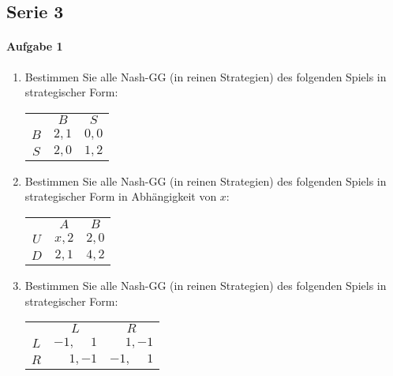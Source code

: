 \subsection{Serie 3}%
\label{sub:serie_3}

\paragraph{Aufgabe 1}%
\label{par:aufgabe_1}

\begin{enumerate}
  \item Bestimmen Sie alle Nash-GG (in reinen Strategien) des folgenden Spiels in
    strategischer Form:
    \begin{center}
      \begin{tabular}{ccc}
        & $B$ & $S$\\
        \cmidrule{2-3}
        $B$ & $2,1$ & $0,0$\\
        \cmidrule{2-3}
        $S$ & $2,0$ & $1,2$\\
        \cmidrule{2-3}
      \end{tabular}
    \end{center}
  \item Bestimmen Sie alle Nash-GG (in reinen Strategien) des folgenden Spiels in
    strategischer Form in Abhängigkeit von $x$:
    \begin{center}
      \begin{tabular}{ccc}
        & $A$ & $B$\\
        \cmidrule{2-3}
        $U$ & $x,2$ & $2,0$\\
        \cmidrule{2-3}
        $D$ & $2,1$ & $4,2$\\
        \cmidrule{2-3}
      \end{tabular}
    \end{center}
  \item Bestimmen Sie alle Nash-GG (in reinen Strategien) des folgenden Spiels in
    strategischer Form:
    \begin{center}
      \begin{tabular}{ccc}
        & $L$ & $R$\\
        \cmidrule{2-3}
        $L$ & $-1, \phantom{-}1$ & $\phantom{-}1, -1$\\
        \cmidrule{2-3}
        $R$ & $\phantom{-}1, -1$ & $-1, \phantom{-}1$\\
        \cmidrule{2-3}
      \end{tabular}
    \end{center}
\end{enumerate}

